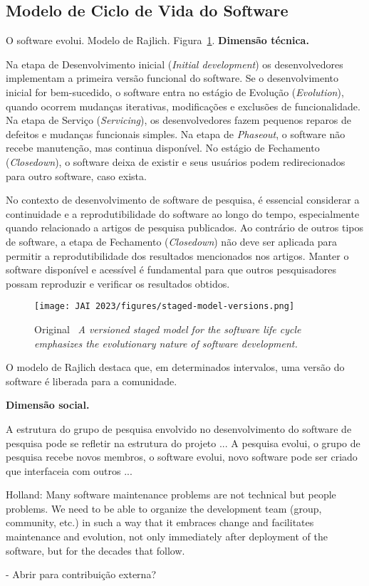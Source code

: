 \subsection{Modelo de Ciclo de Vida do Software}

O software evolui. Modelo de Rajlich. Figura~\ref{fig:staged:model}. \textbf{Dimensão técnica.}

Na etapa de Desenvolvimento inicial (\textit{Initial development}) os desenvolvedores implementam a primeira versão funcional do software.
Se o desenvolvimento inicial for bem-sucedido, o software entra no estágio de Evolução (\textit{Evolution}), quando ocorrem mudanças iterativas, modificações e exclusões de funcionalidade. 
Na etapa de Serviço (\textit{Servicing}), os desenvolvedores fazem pequenos reparos de defeitos e mudanças funcionais simples.
Na etapa de \textit{Phaseout}, o software não recebe manutenção, mas continua disponível. No estágio de Fechamento (\textit{Closedown}), o software deixa de existir e seus usuários podem redirecionados para outro software, caso exista.

No contexto de desenvolvimento de software de pesquisa, é essencial considerar a continuidade e a reprodutibilidade do software ao longo do tempo, especialmente quando relacionado a artigos de pesquisa publicados.
Ao contrário de outros tipos de software, a etapa de Fechamento (\textit{Closedown}) não deve ser aplicada para permitir a reprodutibilidade dos resultados mencionados nos artigos.
Manter o software disponível e acessível é fundamental para que outros pesquisadores possam reproduzir e verificar os resultados obtidos.

\begin{figure}[htb]
    \centering
    \texttt{[image: JAI 2023/figures/staged-model-versions.png]}
    \caption{Original~\cite{rajlich:staged:2000} \textit{A versioned staged model for the software life cycle emphasizes the evolutionary nature of software development.}}
    \label{fig:staged:model}
\end{figure}

O modelo de Rajlich destaca que, em determinados intervalos, uma versão do software é liberada para a comunidade. 

\textbf{Dimensão social.} 

A estrutura do grupo de pesquisa envolvido no desenvolvimento do software de pesquisa pode se refletir na estrutura do projeto ... 
A pesquisa evolui, o grupo de pesquisa recebe novos membros, o software evolui, novo software pode ser criado que interfaceia com outros ...


Holland: Many software maintenance problems are not technical but people problems. 
We need to be able to organize the development team (group, community, etc.) in such a way that it embraces change and facilitates maintenance and evolution, not only immediately after deployment of the software, but for the decades that follow.

- Abrir para contribuição externa?


